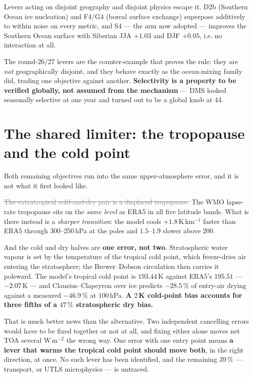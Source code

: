\documentclass[10pt]{article}
\newcommand{\dead}[1]{\textcolor{gray}{\sout{#1}}}
\begin{document}
Levers acting on disjoint geography and disjoint physics escape it. D2b (Southern Ocean ice
nucleation) and F4/G4 (boreal surface exchange) superpose additively to within noise on
every metric, and S4 --- the arm now adopted --- improves the Southern Ocean surface with
Siberian JJA $+1.03$ and DJF $+0.05$, i.e. no interaction at all.

The round-26/27 levers are the counter-example that proves the rule: they are \emph{not}
geographically disjoint, and they behave exactly as the ocean-mixing family did, trading
one objective against another. \textbf{Selectivity is a property to be verified globally,
not assumed from the mechanism} --- DMS looked seasonally selective at one year and turned
out to be a global knob at 44.

\section{The shared limiter: the tropopause and the cold point}\label{sec:limiter}

Both remaining objectives run into the same upper-atmosphere error, and it is not what it
first looked like.

\dead{The extratropical cold-and-dry pair is a displaced tropopause.} The WMO lapse-rate
tropopause sits on the \emph{same level} as ERA5 in all five latitude bands. What is there
instead is a \emph{sharper transition}: the model cools $+1.8$\,K\,km$^{-1}$ faster than
ERA5 through 300--250\,hPa at the poles and $1.5$--$1.9$ slower above 200.

And the cold and dry halves are \textbf{one error, not two}. Stratospheric water vapour is
set by the temperature of the tropical cold point, which freeze-dries air entering the
stratosphere; the Brewer--Dobson circulation then carries it poleward. The model's tropical
cold point is $193.44$\,K against ERA5's $195.51$ --- $-2.07$\,K --- and Clausius--Clapeyron
over ice predicts $-28.5\,\%$ of entry-air drying against a measured $-46.9\,\%$ at
100\,hPa. \textbf{A $2$\,K cold-point bias accounts for three fifths of a $47\,\%$
stratospheric dry bias.}

That is much better news than the alternative. Two independent cancelling errors would have
to be fixed together or not at all, and fixing either alone moves net TOA several
W\,m$^{-2}$ the wrong way. One error with one entry point means \textbf{a lever that warms
the tropical cold point should move both}, in the right direction, at once. No such lever
has been identified, and the remaining $39\,\%$ --- transport, or UTLS microphysics --- is
untraced.
\end{document}
